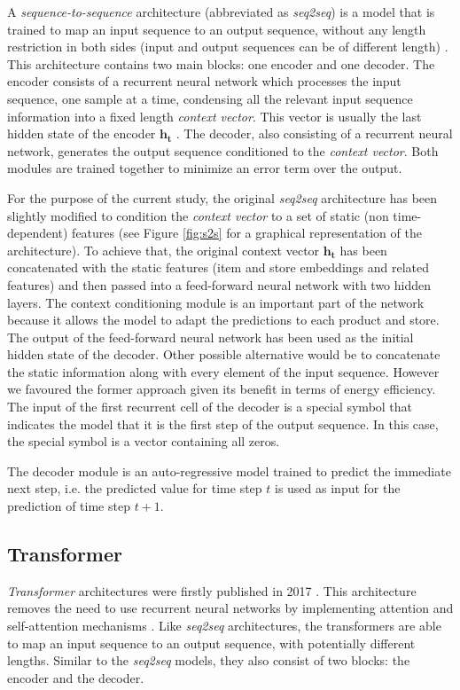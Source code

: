 A \textit{sequence-to-sequence} architecture (abbreviated as \textit{seq2seq}) is a model that is trained to map an input sequence to an output sequence, without any length restriction in both sides (input and output sequences can be of different length) \autocite{sutskever2014}. This architecture contains two main blocks: one encoder and one decoder. The encoder consists of a recurrent neural network which processes the input sequence, one sample at a time, condensing all the relevant input sequence information into a fixed length \textit{context vector}. This vector is usually the last hidden state of the encoder $\mathbf{h_t}$ \autocite{uday2019}. The decoder, also consisting of a recurrent neural network, generates the output sequence conditioned to the \textit{context vector}. Both modules are trained together to minimize an error term over the output.



For the purpose of the current study, the original \textit{seq2seq} architecture has been slightly modified to condition the \textit{context vector} to a set of static (non time-dependent) features (see Figure \ref{fig:s2s} for a graphical representation of the architecture). To achieve that, the original context vector $\mathbf{h_t}$ has been concatenated with the static features (item and store embeddings and related features) and then passed into a feed-forward neural network with two hidden layers. The context conditioning module is an important part of the network because it allows the model to adapt the predictions to each product and store. The output of the feed-forward neural network has been used as the initial hidden state of the decoder. Other possible alternative would be to concatenate the static information along with every element of the input sequence. However we favoured the former approach given its benefit in terms of energy efficiency. The input of the first recurrent cell of the decoder is a special symbol that indicates the model that it is the first step of the output sequence. In this case, the special symbol is a vector containing all zeros.

The decoder module is an auto-regressive model trained to predict the immediate next step, i.e. the predicted value for time step $t$ is used as input for the prediction of time step $t+1$.



\subsection{Transformer}
\textit{Transformer} architectures were firstly published  in 2017 \autocite{vaswani2017}. This architecture removes the need to use recurrent neural networks by implementing attention and self-attention mechanisms \autocite{bahdanau2015}.  Like \textit{seq2seq} architectures, the transformers are able to map an input sequence to an output sequence, with potentially different lengths. Similar to the \textit{seq2seq} models, they also consist of two blocks: the encoder and the decoder.

